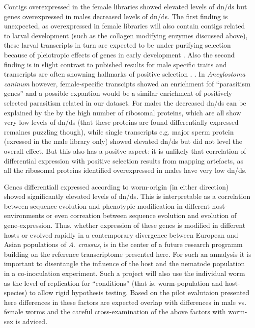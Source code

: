 \documentclass[10pt]{bmc_article}
\newenvironment{bmcformat}{\begin{raggedright}\baselineskip20pt\sloppy\setboolean{publ}{false}}{\end{raggedright}\baselineskip20pt\sloppy}
\begin{document}
\begin{bmcformat}
Contigs overexpressed in the female libraries showed elevated levels
of dn/ds but genes overexpressed in males decreased levels of
dn/ds. The first finding is unexpected, as overexpressed in female
libraries will also contain contigs related to larval development
(such as the collagen modifying enzymes discussed above), these larval
transcripts in turn are expected to be under purifying selection
because of pleiotropic effects of genes in early development
\cite{pmid15371532}. Also the second finding is in slight contrast to
pubished results for male specific traits and transcripts are often
showning hallmarks of positive selection
\cite{pmid15795858,pmid11404480}. . In \textit{Ancylostoma caninum}
however, female-specific transcipts showed an enrichment fof
``parasitism genes'' \cite{pmid20470405} and a possible expantion
would be a similar enrichment of positively selected parasitism
related in our dataset. For males the decreased dn/ds can be explained
by the by the high number of ribosomal proteins, which are all show
very low levels of dn/ds (that these proteins are found differentially
expressed remaines puzzling though), while single transcripts
e.g. major sperm protein (exressed in the male library only) showed
elevated dn/ds but did not level the overall effect. But this also has
a positve aspect: it is unlikely that correlation of differential
expression with positive selection results from mapping artefacts, as
all the ribosomal proteins identified overexpressed in males have very
low dn/ds.

Genes differentiall expressed according to worm-origin (in either
direction) showed significantly elevated levels of dn/ds. This is
interpretable as a correlation between sequence evolution and
phenotypic modification in different host-environments or even
correation between sequence evolution and evolution of
gene-expression. Thus, whether expression of these genes is modified
in different hosts or evolved rapidly in a contemporary divergence
between European and Asian populations of \textit{A. crassus}, is in
the center of a future research programm building on the reference
transcriptome presented here. For such an annalysis it is important to
disentangle the influence of the host and the nematode population in a
co-inoculation experiment. Such a project will also use the individual
worm as the level of replication for ``conditions'' (that is,
worm-population and host-species) to allow rigid hypothesis
testing. Based on the pilot evalutaion presented here differences in
these factors are expected overlap with differences in male vs. female
worms and the careful cross-examination of the above factors with
worm-sex is adviced.


\end{bmcformat}
\end{document}
